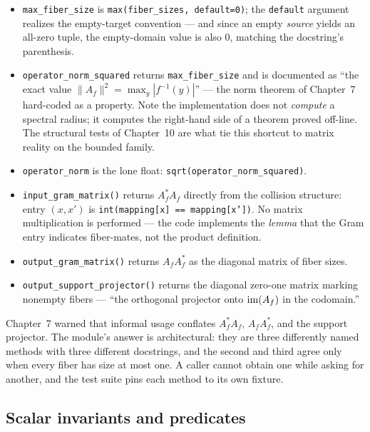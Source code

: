 \begin{itemize}
\item \texttt{max\_fiber\_size} is \texttt{max(fiber\_sizes, default=0)};
      the \texttt{default} argument realizes the empty-target convention
      --- and since an empty \emph{source} yields an all-zero tuple, the
      empty-domain value is also $0$, matching the docstring's
      parenthesis.
\item \texttt{operator\_norm\_squared} returns \texttt{max\_fiber\_size}
      and is documented as ``the exact value
      $\lVert A_f\rVert^2 = \max_y |f^{-1}(y)|$'' --- the norm theorem of
      Chapter~7 hard-coded as a property. Note the implementation does not
      \emph{compute} a spectral radius; it computes the right-hand side of
      a theorem proved off-line. The structural tests of Chapter~10 are
      what tie this shortcut to matrix reality on the bounded family.
\item \texttt{operator\_norm} is the lone float:
      \texttt{sqrt(operator\_norm\_squared)}.
\item \texttt{input\_gram\_matrix()} returns $A_f^* A_f$ directly from the
      collision structure: entry $(x, x')$ is
      \texttt{int(mapping[x] == mapping[x'])}. No matrix multiplication is
      performed --- the code implements the \emph{lemma} that the Gram
      entry indicates fiber-mates, not the product definition.
\item \texttt{output\_gram\_matrix()} returns $A_f A_f^*$ as the diagonal
      matrix of fiber sizes.
\item \texttt{output\_support\_projector()} returns the diagonal zero-one
      matrix marking nonempty fibers --- ``the orthogonal projector onto
      $\mathrm{im}(A_f)$ in the codomain.''
\end{itemize}

\begin{remark}\label{ch09:rem:three-ops}
Chapter~7 warned that informal usage conflates $A_f^* A_f$, $A_f A_f^*$,
and the support projector. The module's answer is architectural: they are
three differently named methods with three different docstrings, and the
second and third agree only when every fiber has size at most one. A caller
cannot obtain one while asking for another, and the test suite pins each
method to its own fixture.
\end{remark}

\subsection{Scalar invariants and predicates}


